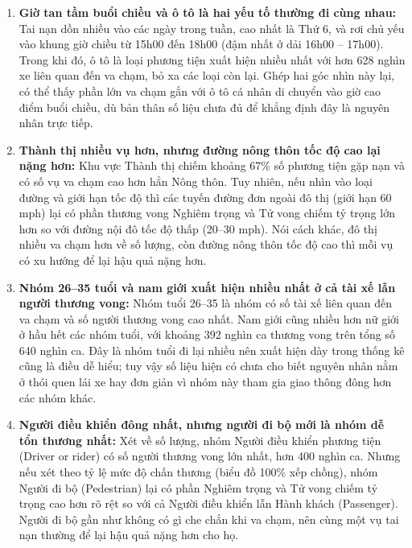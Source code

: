 \begin{enumerate}
    \item \textbf{Giờ tan tầm buổi chiều và ô tô là hai yếu tố thường đi cùng nhau:}
    Tai nạn dồn nhiều vào các ngày trong tuần, cao nhất là Thứ 6, và rơi chủ yếu vào khung giờ chiều từ 15h00 đến 18h00 (đậm nhất ở dải 16h00 -- 17h00). Trong khi đó, ô tô là loại phương tiện xuất hiện nhiều nhất với hơn 628 nghìn xe liên quan đến va chạm, bỏ xa các loại còn lại. Ghép hai góc nhìn này lại, có thể thấy phần lớn va chạm gắn với ô tô cá nhân di chuyển vào giờ cao điểm buổi chiều, dù bản thân số liệu chưa đủ để khẳng định đây là nguyên nhân trực tiếp.
    
    \item \textbf{Thành thị nhiều vụ hơn, nhưng đường nông thôn tốc độ cao lại nặng hơn:}
    Khu vực Thành thị chiếm khoảng 67\% số phương tiện gặp nạn và có số vụ va chạm cao hơn hẳn Nông thôn. Tuy nhiên, nếu nhìn vào loại đường và giới hạn tốc độ thì các tuyến đường đơn ngoài đô thị (giới hạn 60 mph) lại có phần thương vong Nghiêm trọng và Tử vong chiếm tỷ trọng lớn hơn so với đường nội đô tốc độ thấp (20--30 mph). Nói cách khác, đô thị nhiều va chạm hơn về số lượng, còn đường nông thôn tốc độ cao thì mỗi vụ có xu hướng để lại hậu quả nặng hơn.
    
    \item \textbf{Nhóm 26--35 tuổi và nam giới xuất hiện nhiều nhất ở cả tài xế lẫn người thương vong:}
    Nhóm tuổi 26--35 là nhóm có số tài xế liên quan đến va chạm và số người thương vong cao nhất. Nam giới cũng nhiều hơn nữ giới ở hầu hết các nhóm tuổi, với khoảng 392 nghìn ca thương vong trên tổng số 640 nghìn ca. Đây là nhóm tuổi đi lại nhiều nên xuất hiện dày trong thống kê cũng là điều dễ hiểu; tuy vậy số liệu hiện có chưa cho biết nguyên nhân nằm ở thói quen lái xe hay đơn giản vì nhóm này tham gia giao thông đông hơn các nhóm khác.
    
    \item \textbf{Người điều khiển đông nhất, nhưng người đi bộ mới là nhóm dễ tổn thương nhất:}
    Xét về số lượng, nhóm Người điều khiển phương tiện (Driver or rider) có số người thương vong lớn nhất, hơn 400 nghìn ca. Nhưng nếu xét theo tỷ lệ mức độ chấn thương (biểu đồ 100\% xếp chồng), nhóm Người đi bộ (Pedestrian) lại có phần Nghiêm trọng và Tử vong chiếm tỷ trọng cao hơn rõ rệt so với cả Người điều khiển lẫn Hành khách (Passenger). Người đi bộ gần như không có gì che chắn khi va chạm, nên cùng một vụ tai nạn thường để lại hậu quả nặng hơn cho họ.
\end{enumerate}

